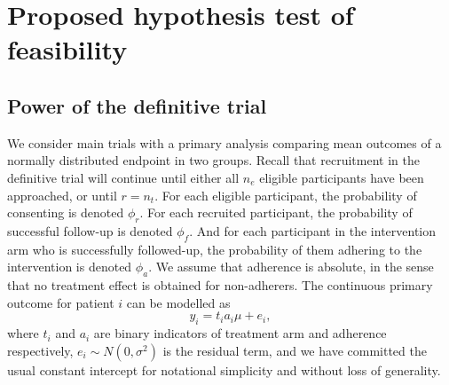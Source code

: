 \documentclass[AMA,STIX1COL]{WileyNJD-v2}
\begin{document}
\section{Proposed hypothesis test of feasibility}\label{sec:methods}


\subsection{Power of the definitive trial}\label{sec:power}

We consider main trials with a primary analysis comparing mean outcomes of a normally distributed endpoint in two groups. Recall that recruitment in the definitive trial will continue until either all $n_e$ eligible participants have been approached, or until $r = n_t$. For each eligible participant, the probability of consenting is denoted $\phi_r$. For each recruited participant, the probability of successful follow-up is denoted $\phi_f$. And for each participant in the intervention arm who is successfully followed-up, the probability of them adhering to the intervention is denoted $\phi_a$. We assume that adherence is absolute, in the sense that no treatment effect is obtained for non-adherers. The continuous primary outcome for patient $i$ can be modelled as
$$
y_i = t_i a_i \mu + e_i,
$$
where $t_i$ and $a_i$ are binary indicators of treatment arm and adherence respectively, $e_i \sim N(0, \sigma^2)$ is the residual term, and we have committed the usual constant intercept for notational simplicity and without loss of generality.
\end{document}
